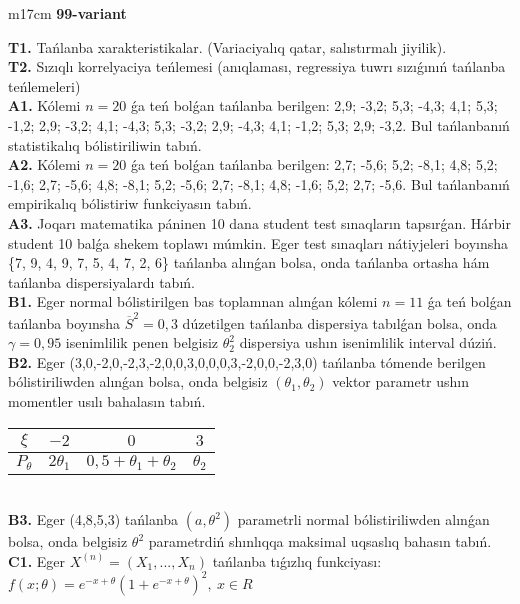 \documentclass{article}
\begin{document}
\begin{tabular}{m{17cm}}
\textbf{99-variant}
\newline

\textbf{T1.} 
Tańlanba xarakteristikalar. (Variaciyalıq qatar, salıstırmalı jiyilik).
 \\
\textbf{T2.} 
Sızıqlı korrelyaciya teńlemesi (anıqlaması, regressiya tuwrı sızıǵınıń tańlanba teńlemeleri)
 \\
\textbf{A1.} 
Kólemi \(n = 20\) ǵa teń bolǵan tańlanba berilgen: 2,9; -3,2; 5,3; -4,3; 4,1; 5,3; -1,2; 2,9; -3,2; 4,1; -4,3; 5,3; -3,2; 2,9; -4,3; 4,1; -1,2; 5,3; 2,9; -3,2. Bul tańlanbanıń statistikalıq bólistiriliwin tabıń.
 \\
\textbf{A2.} 
Kólemi \(n = 20\) ǵa teń bolǵan tańlanba berilgen: 2,7; -5,6; 5,2; -8,1; 4,8; 5,2; -1,6; 2,7; -5,6; 4,8; -8,1; 5,2; -5,6; 2,7; -8,1; 4,8; -1,6; 5,2; 2,7; -5,6. Bul tańlanbanıń empirikalıq bólistiriw funkciyasın tabıń.
 \\
\textbf{A3.} 
Joqarı matematika páninen 10 dana student test sınaqların tapsırǵan. Hárbir student 10 balǵa shekem toplawı múmkin. Eger test sınaqları nátiyjeleri boyınsha \{7, 9, 4, 9, 7, 5, 4, 7, 2, 6\} tańlanba alınǵan bolsa, onda tańlanba ortasha hám tańlanba dispersiyalardı tabıń.
 \\
\textbf{B1.} 
Eger normal bólistirilgen bas toplamnan alınǵan kólemi \(n = 11\) ǵa teń bolǵan tańlanba boyınsha \({\overline{S}}^{2} = 0,3\) dúzetilgen tańlanba dispersiya tabılǵan bolsa, onda \(\gamma = 0,95\) isenimlilik penen belgisiz \(\theta_{2}^{2}\) dispersiya ushın isenimlilik interval dúziń.
 \\
\textbf{B2.} 
Eger (3,0,-2,0,-2,3,-2,0,0,3,0,0,0,3,-2,0,0,-2,3,0) tańlanba tómende berilgen bólistiriliwden alınǵan bolsa, onda belgisiz \(\left( \theta_{1},\theta_{2} \right)\) vektor parametr ushın momentler usılı bahalasın tabıń.
\begin{tabular}{|c|c|c|c|}
  \hline
$\xi$ &
$- 2$ &
$0$ &
$3$\\
\hline
\(P_{\theta}\) & \({2\theta}_{1}\) & \(0,5 + \theta_{1} + \theta_{2}\) & \(\theta_{2}\) \\
\hline
\end{tabular}
 \\
\textbf{B3.} 
Eger (4,8,5,3) tańlanba \(\left( a,\theta^{2} \right)\) parametrli normal bólistiriliwden alınǵan bolsa, onda belgisiz \(\theta^{2}\) parametrdiń shınlıqqa maksimal uqsaslıq bahasın tabıń.
 \\
\textbf{C1.} 
Eger \(X^{(n)} = \left( X_{1},...,X_{n} \right)\) tańlanba tıǵızlıq funkciyası: \(f(x;\theta) = e^{- x + \theta}\left( 1 + e^{- x + \theta} \right)^{2},\ x \in R\)

\end{tabular}
\end{document}
